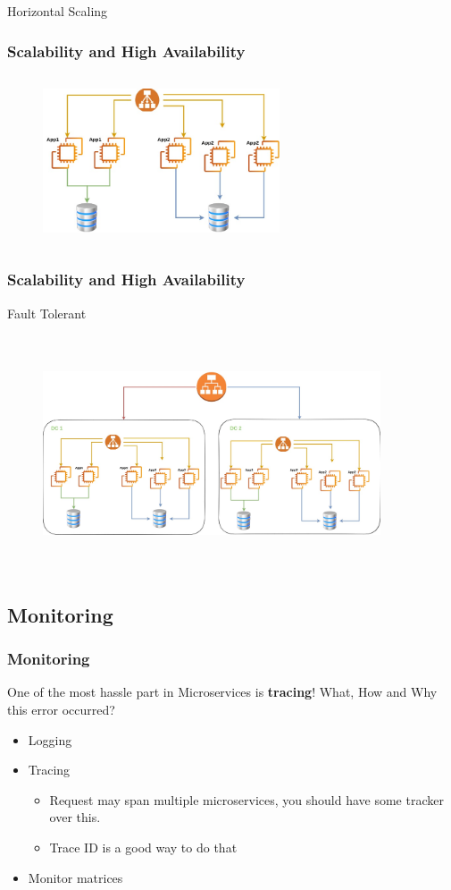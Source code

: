 \documentclass{beamer}
\begin{document}
	\begin{frame}
		Horizontal Scaling
		\frametitle{Scalability and High Availability}
		\begin{figure}[h]
			\includegraphics[width=70mm, height=50mm, scale=1]{img/horizontal-scaling.jpg}
		\end{figure}	
	\end{frame}

	\begin{frame}
		\frametitle{Scalability and High Availability}
		Fault Tolerant
		\begin{figure}[h]
			\includegraphics[width=100mm, height=70mm, scale=1]{img/High-Availability.jpg}
		\end{figure}	
	\end{frame}	

	\subsection {Monitoring}
		\begin{frame}
			\frametitle{Monitoring}
				One of the most hassle part in Microservices is \textbf{tracing}! What, How and Why this error occurred? 
				\begin{itemize}
					\item Logging 
					\item Tracing
						\begin{itemize}
							\item \scriptsize{Request may span multiple microservices, you should have some tracker over this.}
							\item \scriptsize{Trace ID is a good way to do that}
						\end{itemize}
					\item Monitor matrices 
				\end{itemize}
			\vspace{100mm}
		\end{frame}
	
\end{document}

